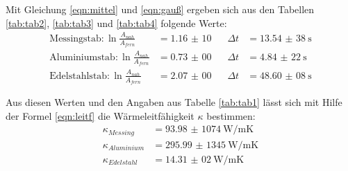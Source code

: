 



Mit Gleichung \ref{eqn:mittel} und \ref{eqn:gauß} ergeben sich aus den Tabellen
\ref{tab:tab2}, \ref{tab:tab3} und \ref{tab:tab4} folgende Werte:
\begin{align*}
  \text{Messingstab}: \ln{\frac{A_{nah}}{A_{fern}}} &=\SI{1,16(10)}\;\;\; &\Delta t &=\SI{13,54(38)}{\s}  \\
  \text{Aluminiumstab}: \ln{\frac{A_{nah}}{A_{fern}}} &=\SI{0,73(00)}\;\;\; &\Delta t &=\SI{4,84(22)}{\s}   \\
  \text{Edelstahlstab}: \ln{\frac{A_{nah}}{A_{fern}}} &=\SI{2,07(00)}\;\;\; &\Delta t &=\SI{48,60(08)}{\s}
\end{align*}

Aus diesen Werten und den Angaben aus Tabelle \ref{tab:tab1} lässt sich mit Hilfe der Formel \ref{eqn:leitf}
die Wärmeleitfähigkeit $\kappa$ bestimmen:
\begin{align*}
  \kappa_{Messing} &=\SI{93,98(1074)}{\W\per\meter\kelvin} \\
  \kappa_{Aluminium} &=\SI{295,99(1345)}{\W\per\meter\kelvin} \\
  \kappa_{Edelstahl} &=\SI{14,31(02)}{\W\per\meter\kelvin}
\end{align*}

\label{sec:Auswertung}


